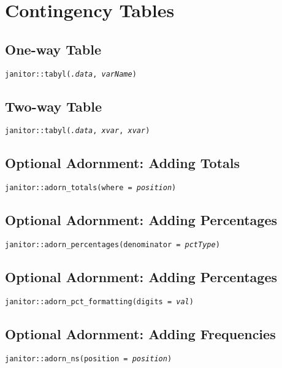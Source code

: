 \documentclass{tufte-handout}
\newenvironment{subs}
  {\adjustwidth{3em}{0pt}}
  {\endadjustwidth}
\begin{document}
\section{Contingency Tables}
\begin{subs}
\subsection{One-way Table}
\noindent \texttt{janitor::}{\color{red}\texttt{tabyl}}\texttt{(\textit{.data}, \textit{varName})}

\vspace{3mm}
\subsection{Two-way Table}
\noindent \texttt{janitor::}{\color{red}\texttt{tabyl}}\texttt{(\textit{.data}, \textit{xvar}, \textit{xvar})}

\vspace{3mm}
\subsection{Optional Adornment: Adding Totals}
\noindent \texttt{janitor::}{\color{red}\texttt{adorn\_totals}}\texttt{(where = \textit{position})}

\vspace{3mm}
\subsection{Optional Adornment: Adding Percentages}
\noindent \texttt{janitor::}{\color{red}\texttt{adorn\_percentages}}\texttt{(denominator = \textit{pctType})}

\vspace{3mm}
\subsection{Optional Adornment: Adding Percentages}
\noindent \texttt{janitor::}{\color{red}\texttt{adorn\_pct\_formatting}}\texttt{(digits = \textit{val})}

\vspace{3mm}
\subsection{Optional Adornment: Adding Frequencies}
\noindent \texttt{janitor::}{\color{red}\texttt{adorn\_ns}}\texttt{(position = \textit{position})}
\end{subs}
\end{document}
